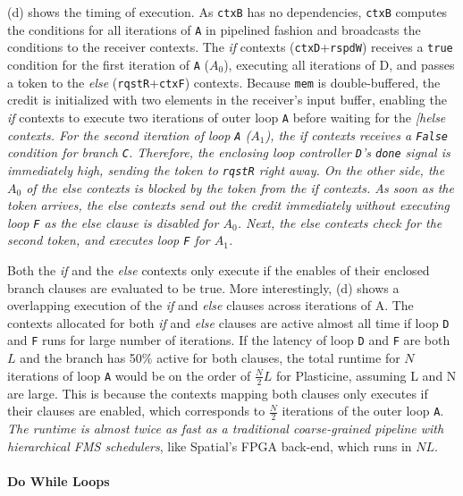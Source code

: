  (d) shows the timing of execution.
As \texttt{ctxB} has no dependencies, \texttt{ctxB} computes the conditions for all iterations of
\texttt{A} in
pipelined fashion and broadcasts the conditions to the receiver contexts.
The \emph{if} contexts (\texttt{ctxD}+\texttt{rspdW}) receives a \texttt{true} condition for the first
iteration of \texttt{A} ($A_0$), 
executing all iterations of D, and passes a token to the \emph{else} (\texttt{rqstR}+\texttt{ctxF}) contexts.
Because \texttt{mem} is double-buffered, the credit is initialized with two elements in the
receiver's input buffer, enabling the \emph{if} contexts to execute two iterations of outer loop
\texttt{A} before
waiting for the \em[h{else} contexts. For the second iteration of loop \texttt{A} ($A_1$), the \emph{if} contexts
receives a \texttt{False} condition for branch \texttt{C}.
Therefore, the enclosing loop controller \texttt{D}'s \texttt{done} signal is immediately high, sending the
token to \texttt{rqstR} right away.
On the other side, the $A_0$ of the \emph{else} contexts is blocked by the token from
the \emph{if} contexts. 
As soon as the token arrives, the \emph{else} contexts send out the credit immediately without
executing loop \texttt{F} as the \emph{else} clause is disabled for $A_0$.
Next, the \emph{else} contexts check for the second token, 
and executes loop \texttt{F} for $A_1$.

Both the \emph{if} and the \emph{else} contexts only execute if the enables of their enclosed branch clauses are
evaluated to be true. More interestingly,  (d) shows a overlapping execution of the
\emph{if} and \emph{else} clauses across iterations of A. 
The contexts allocated for both \emph{if} and \emph{else} clauses are active almost all time if loop \texttt{D}
and \texttt{F} runs for large number of iterations.
If the latency of loop \texttt{D} and \texttt{F} are both $L$ and the branch has 50\% active for both clauses, 
the total runtime for $N$ iterations of loop \texttt{A} would be on the order of $\frac{N}{2}L$
for Plasticine, assuming L and N are large.
This is because the contexts mapping both clauses only executes if their clauses are enabled, which
corresponds to $\frac{N}{2}$ iterations of the outer loop \texttt{A}.
\emph{The runtime is almost twice as fast as a traditional coarse-grained pipeline with hierarchical FMS
schedulers}, like Spatial's FPGA back-end, which runs in $NL$.

\paragraph{Do While Loops}


